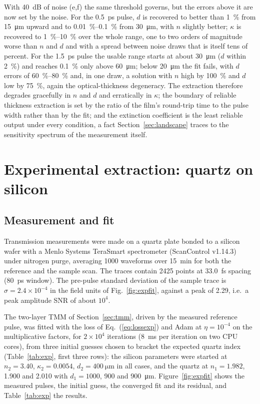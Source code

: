 \documentclass{optica-article}
\newcommand{\kap}{\kappa}
\begin{document}
With \SI{40}{dB} of noise (e,f) the same threshold governs, but the errors above it are now set by the noise. For the \SI{0.5}{\pico\second} pulse, $d$ is recovered to better than \SI{1}{\percent} from \SI{15}{\micro\metre} upward and to \SIrange{0.01}{0.1}{\percent} from \SI{30}{\micro\metre}, with $n$ slightly better; $\kap$ is recovered to \SIrange{1}{10}{\percent} over the whole range, one to two orders of magnitude worse than $n$ and $d$ and with a spread between noise draws that is itself tens of percent. For the \SI{1.5}{\pico\second} pulse the usable range starts at about \SI{30}{\micro\metre} ($d$ within \SI{2}{\percent}) and reaches \SI{0.1}{\percent} only above \SI{60}{\micro\metre}; below \SI{20}{\micro\metre} the fit fails, with $d$ errors of \SIrange{60}{80}{\percent} and, in one draw, a solution with $n$ high by \SI{100}{\percent} and $d$ low by \SI{75}{\percent}, again the optical-thickness degeneracy. The extraction therefore degrades gracefully in $n$ and $d$ and erratically in $\kap$; the boundary of reliable thickness extraction is set by the ratio of the film's round-trip time to the pulse width rather than by the fit; and the extinction coefficient is the least reliable output under every condition, a fact Section~\ref{sec:landscape} traces to the sensitivity spectrum of the measurement itself.

\section{Experimental extraction: quartz on silicon}\label{sec:exp}
\subsection{Measurement and fit}
Transmission measurements were made on a quartz plate bonded to a silicon wafer  with a Menlo Systems TeraSmart spectrometer (ScanControl v1.14.3) under nitrogen purge, averaging 1000 waveforms over \SI{15}{\minute} for both the reference and the sample scan. The traces contain 2425 points at \SI{33.0}{\femto\second} spacing (\SI{80}{\pico\second} window). The pre-pulse standard deviation of the sample trace is $\sigma=2.4\times10^{-4}$ in the field units of Fig.~\ref{fig:expfit}, against a peak of 2.29, i.e.\ a peak amplitude SNR of about $10^4$.

The two-layer TMM of Section~\ref{sec:tmm}, driven by the measured reference pulse, was fitted with the loss of Eq.~(\ref{eq:lossexp}) and Adam at $\eta=10^{-4}$ on the multiplicative factors, for $2\times10^4$ iterations (\SI{8}{\milli\second} per iteration on two CPU cores), from three initial guesses chosen to bracket the expected quartz index (Table~\ref{tab:exp}, first three rows): the silicon parameters were started at $n_2=3.40$, $\kap_2=0.0054$, $d_2=\SI{400}{\micro\metre}$ in all cases, and the quartz at $n_1=1.982$, 1.900 and 2.010 with $d_1=1000$, 900 and \SI{900}{\micro\metre}. Figure~\ref{fig:expfit} shows the measured pulses, the initial guess, the converged fit and its residual, and Table~\ref{tab:exp} the results.
\end{document}
